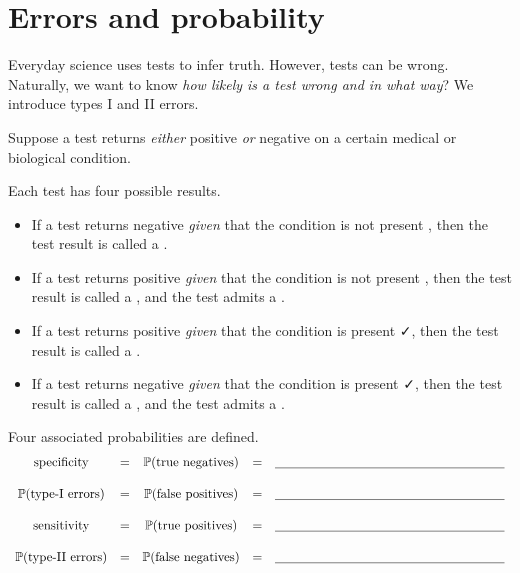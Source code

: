 \documentclass[../main.tex]{subfiles}
\begin{document}
 \section{Errors and probability}

Everyday science uses tests to infer truth. However, tests can be wrong. Naturally, we want to know \emph{how likely is a test wrong and in what way}? We introduce types I and II errors.

\begin{definition}\label{def:errors}
  Suppose a test returns \emph{either} positive \emph{or} negative on a certain medical or biological condition. 

  Each test has four possible results.
  \begin{itemize}
    \item If a test returns negative \faThumbsDown[regular]{} \emph{given} that the condition is not present \faTimes{}, then the test result is called a .

    \item If a test returns positive \faThumbsUp[regular]{} \emph{given} that the condition is not present \faTimes{}, then the test result is called a , and the test admits a .

    \item If a test returns positive \faThumbsUp[regular]{} \emph{given} that the condition is present \faCheck{}, then the test result is called a .

    \item If a test returns negative \faThumbsDown[regular]{} \emph{given} that the condition is present \faCheck{}, then the test result is called a , and the test admits a .
  \end{itemize}

  Four associated probabilities are defined.%
  \begin{displaymath}
    \begin{array}{ccccc}
      \text{specificity} &=& \mathbb{P}(\text{true negatives}) &=& \underline{\hspace{2.5in}} \\[3ex]
      \mathbb{P}(\text{type-I errors}) &=& \mathbb{P}(\text{false positives}) &=& \underline{\hspace{2.5in}} \\[3ex]
      \text{sensitivity} &=& \mathbb{P}(\text{true positives}) &=& \underline{\hspace{2.5in}} \\[3ex]
      \mathbb{P}(\text{type-II errors}) &=& \mathbb{P}(\text{false negatives}) &=& \underline{\hspace{2.5in}} \\[3ex]
    \end{array}
  \end{displaymath}
\end{definition}
\end{document}
